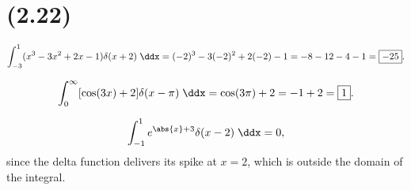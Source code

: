 \section{(2.22)}

\begin{parts}
    \item 
        \begin{equation*}
            \int_{-3}^1 (x^3 - 3x^2 + 2x - 1)\delta(x+2) \;\ddx = (-2)^3 - 3(-2)^2 + 2(-2) - 1 = -8-12-4-1 = \boxed{-25}.
        \end{equation*}
    \item 
        \begin{equation*}
            \int_0^{\infty} [\cos(3x) + 2]\delta(x - \pi) \;\ddx = \cos(3\pi) + 2 = -1 + 2 = \boxed{1}.
        \end{equation*}
    \item 
        \begin{equation*}
            \int_{-1}^1 e^{\abs{x} + 3} \delta(x-2) \;\ddx = 0,
        \end{equation*}
        since the delta function delivers its spike at $x=2$, which is outside the domain of the integral.
\end{parts}
